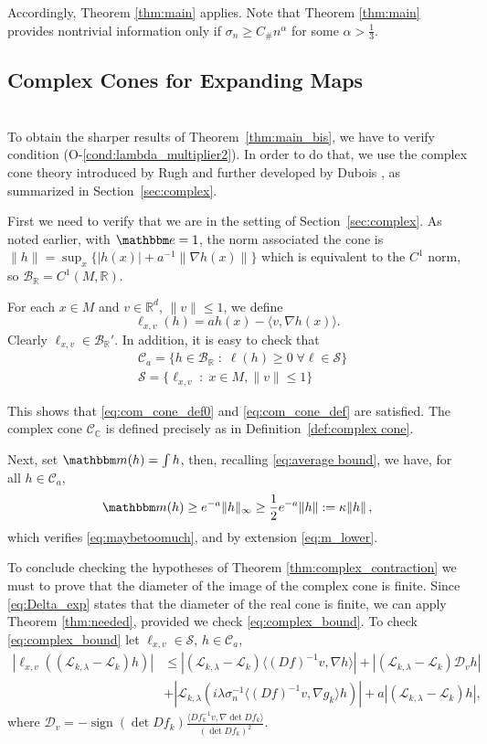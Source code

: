 \documentclass{amsart}
\numberwithin{equation}{section}
\newcommand\cB{{\mathcal B}}
\newcommand\cC{{\mathcal C}}
\newcommand\cD{{\mathcal D}}
\newcommand\cL{{\mathcal L}}
\newcommand\cS{{\mathcal S}}
\newcommand\bC{{\mathbb C}}
\newcommand\bR{{\mathbb R}}
\newcommand{\bbe}{\mathbbm e}
\newcommand{\bbm}{\mathbbm m}
\newcommand{\Const}{C_{\#}}
\newcommand{\sign}{\operatorname{sign}}
\begin{document}
Accordingly, Theorem \ref{thm:main} applies. 
Note that Theorem \ref{thm:main} provides nontrivial information only if $\sigma_n\geq \Const n^\alpha$ for some $\alpha>\frac 13$.
\subsection{Complex Cones for Expanding Maps}\ \\
To obtain the sharper results of Theorem~\ref{thm:main_bis}, we have to verify condition (O-\ref{cond:lambda_multiplier2}). In order to do that, we use the complex cone theory introduced by Rugh and further developed by  Dubois \cite{Ru10, Du09, Du11}, 
as summarized in Section~\ref{sec:complex}.

First we need to verify that we are in the setting of Section~\ref{sec:complex}.
As noted earlier, with $\bbe =1$, the norm associated the cone is $\|h\|=\sup_x\{|h(x)|+a^{-1}\|\nabla h(x)\|\}$ which is equivalent to the $C^1$ norm, so $\cB_\bR= C^1(M, \bR)$.

For each $x\in M$ and $v\in\bR^d$, {$\| v\|  \le 1$, }  we define 
\[
\ell_{x,v}(h)=ah(x)-\langle v, \nabla h(x) \rangle .
\]
Clearly $\ell_{x,v}\in\cB_\bR'$.
In addition, it is easy to check that 
\[
\begin{split}
&\cC_a=\{h\in\cB_\bR\;:\; \ell (h)\geq 0\; \forall \ell\in\cS\}\\
&\cS=\{\ell_{x,v}\;:\; x\in M, \|v\|  \le  1\}
\end{split}
\]

This shows that \eqref{eq:com_cone_def0} and \eqref{eq:com_cone_def} are satisfied.
The complex cone $\cC_{\bC}$ is defined precisely as in Definition~\ref{def:complex cone}.

Next, set $\bbm(h)=\int h$, then, recalling \eqref{eq:average bound}, we have, for all $h\in\cC_a$,
\begin{equation}\label{eq:maybe_exp}
\bbm(h)\geq e^{-a} \|h\|_\infty\geq \frac 12e^{-a}\|h\|:=\kappa \|h\| \, ,
\end{equation}
which verifies \eqref{eq:maybetoomuch}, and by extension \eqref{eq:m_lower}.

To conclude checking the hypotheses of Theorem \ref{thm:complex_contraction} we must to prove that the diameter of the image of the complex cone is finite. Since \eqref{eq:Delta_exp} states that the diameter of the real cone is finite, we can apply Theorem \ref{thm:needed}, provided we check \eqref{eq:complex_bound}.
To check  \eqref{eq:complex_bound} let  $\ell_{x,v}\in \cS$, $h \in \cC_a$,
\begin{equation}
\label{eq:upper ell}
\begin{split}
\left|\ell_{x,v}\left((\cL_{k,\lambda}-\cL_k) h\right)\right|&\leq \left|(\cL_{k,\lambda}-\cL_k) \langle (D f)^{-1}v,\nabla h\rangle\right|+ \left|(\cL_{k,\lambda}-\cL_k) \cD_v h\right|\\
&+\left|\cL_{k,\lambda}(i\lambda \sigma_n^{-1} \langle (D f)^{-1}v,\nabla g_k\rangle h)\right| 
+ a \left| (\cL_{k, \lambda} - \cL_k)h \right| , 
\end{split}
\end{equation}
where $\cD_v=-\sign (\det Df_k)\frac{\langle Df_k^{-1}v,\nabla \det Df_k\rangle}{(\det Df_k)^2}$.
\end{document}
